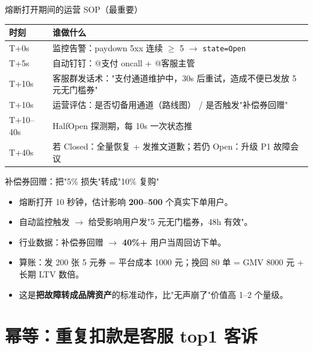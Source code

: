 \documentclass[aspectratio=169,11pt]{beamer}
\begin{document}
\begin{frame}[shrink]{熔断打开期间的运营 SOP（最重要）}
\small
\begin{tabular}{@{}lp{8cm}@{}}
\toprule
时刻 & 谁做什么 \\
\midrule
T+0s & 监控告警：paydown 5xx 连续 $\geq$ 5 $\to$ \texttt{state=Open} \\
T+5s & 自动钉钉：@支付 oncall + @客服主管 \\
T+10s & 客服群发话术："支付通道维护中，30s 后重试，造成不便已发放 5 元无门槛券" \\
T+10s & 运营评估：是否切备用通道（路线图） / 是否触发"补偿券回赠" \\
T+10--40s & HalfOpen 探测期，每 10s 一次状态推 \\
T+40s & 若 Closed：全量恢复 + 发推文道歉；若仍 Open：升级 P1 故障会议 \\
\bottomrule
\end{tabular}
\vspace{1mm}
\end{frame}

\begin{frame}[shrink]{补偿券回赠：把"5\% 损失"转成"10\% 复购"}
\begin{itemize}
  \item 熔断打开 10 秒钟，估计影响 \textbf{200--500} 个真实下单用户。
  \item 自动监控触发 $\to$ 给受影响用户发"5 元无门槛券，48h 有效"。
  \item 行业数据：补偿券回赠 $\to$ \textbf{40\%+} 用户当周回访下单。
  \item 算账：发 200 张 5 元券 = 平台成本 1000 元；挽回 80 单 = GMV 8000 元 + 长期 LTV 数倍。
  \item 这是\textbf{把故障转成品牌资产}的标准动作，比"无声崩了"价值高 1--2 个量级。
\end{itemize}
\end{frame}

\section{幂等：重复扣款是客服 top1 客诉}
\end{document}
